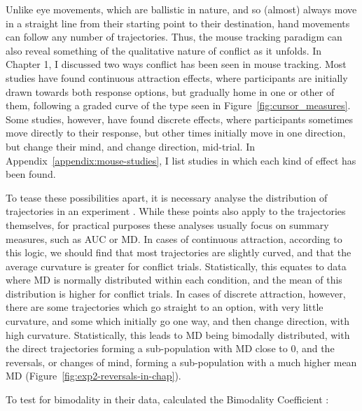 Unlike eye movements, which are ballistic in nature,
and so (almost) always move in a straight line from their starting point to their destination,
hand movements can follow any number of trajectories.
Thus, the mouse tracking paradigm can also reveal
something of the qualitative nature of conflict as it unfolds.
In Chapter 1, I discussed two ways conflict has been seen in mouse tracking.
Most studies have found continuous attraction effects,
where participants are initially drawn towards both response options,
but gradually home in one or other of them,
following a graded curve of the type seen in Figure~\ref{fig:cursor_measures}.
Some studies, however, have found discrete effects,
where participants sometimes move directly to their response,
but other times initially move in one direction,
but change their mind, and change direction, mid-trial.
In Appendix~\ref{appendix:mouse-studies},
I list studies in which each kind of effect has been found.

To tease these possibilities apart,
it is necessary analyse the distribution of trajectories in an experiment
\citep{Spivey2005,Freeman2012}.
While these points also apply to the trajectories themselves,
for practical purposes these analyses usually focus on
summary measures, such as AUC or MD.
In cases of continuous attraction, according to this logic,
we should find that most trajectories are slightly curved,
and that the average curvature is greater for conflict trials.
Statistically, this equates to data where MD is normally distributed within each condition,
and the mean of this distribution is higher for conflict trials.
In cases of discrete attraction, however,
there are some trajectories which go straight to an option, with very little curvature,
and some which initially go one way, and then change direction, with high curvature.
Statistically, this leads to MD being bimodally distributed,
with the direct trajectories forming a sub-population with MD close to $0$,
and the reversals, or changes of mind, forming a sub-population with a much higher mean MD
(Figure~\ref{fig:exp2-reversals-in-chap}).

To test for bimodality in their data,
\citet{Spivey2005} calculated the Bimodality Coefficient \citep[BC;][]{SASInstitute1990}:


